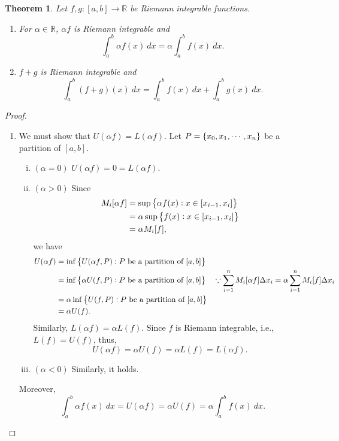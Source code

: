 \documentclass[12pt,openany]{book}
\newtheorem{theorem}{Theorem}[chapter]
\theoremstyle{definition}
\newcommand{\R}{\mathbb{R}}
\newcommand{\ie}{\textnormal{i.e.}}
\begin{document}
	\newpage
	\begin{tcolorbox}[colframe=thmcolor, title={\color{white}\bf Linearity of Riemann Integral}]
		\begin{theorem}
			Let \(f,g:[a,b]\to\R\) be Riemann integrable functions.
			\begin{enumerate}[(1)]
				\item For \(\alpha\in\R\), \(\alpha f\) is Riemann integrable and \[
				\int_a^b\alpha f(x)\ dx = \alpha\int_a^bf(x)\ dx.
				\]
				\item \(f+g\) is Riemann integrable and \[
				\int_a^b(f+g)(x)\ dx = \int_a^bf(x)\ dx + \int_a^b g(x)\ dx.
				\]
			\end{enumerate}
		\end{theorem}
	\end{tcolorbox}
	\begin{proof}
		\begin{enumerate}[(1)]
			\item We must show that \(U(\alpha f)=L(\alpha f)\). Let \(P=\set{x_0,x_1,\cdots, x_n}\) be a partition of \([a,b]\).
			\begin{enumerate}[(i)]
				\item \((\alpha=0)\) \(U(\alpha f)=0=L(\alpha f)\).
				\item \((\alpha>0)\) Since \begin{align*}
					M_i[\alpha f]&=\sup\set{\alpha f(x):x\in\sbr{x_{i-1},x_i}}\\
					&=\alpha\sup\set{f(x):x\in\sbr{x_{i-1},x_i}}\\					&=\alpha M_i[f],
				\end{align*} we have \begin{align*}
				U(\alpha f)&=\inf\set{U(\alpha f, P):\text{$P$ be a partition of $[a,b]$}}\\
				&=\inf\set{\alpha U(f, P):\text{$P$ be a partition of $[a,b]$}}\quad\because \sum_{i=1}^nM_i[\alpha f]\Delta x_i=\alpha\sum_{i=1}^nM_i[f]\Delta x_i\\
				&=\alpha \inf\set{U(f, P):\text{$P$ be a partition of $[a,b]$}}\\
				&=\alpha U(f).
			\end{align*} Similarly, \(L(\alpha f)=\alpha L(f)\). Since \(f\) is Riemann integrable, \ie, \(L(f)=U(f)\), thus, \[
			U(\alpha f)=\alpha U(f)=\alpha L(f)=L(\alpha f).
			\]
			\item \((\alpha<0)\) Similarly, it holds.
			\end{enumerate}
			Moreover, \[
			\int_a^b\alpha f(x)\ dx = U(\alpha f)=\alpha U(f)=\alpha\int_a^b f(x)\ dx.
\]
\end{enumerate}
\end{proof}
\end{document}
